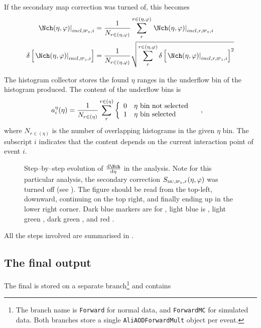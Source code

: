 If the secondary map correction was turned of, this becomes 
\begin{align}
  \label{eq:superhist:2}
  \dndetadphi[incl,\subIPz,i] &=
  \frac{1}{N_{r\in\etaphi}}\sum_{r}^{r\in\etaphi}  
  \dndetadphi[incl,r,\subIPz,i]\\
  \delta\left[\dndetadphi[incl,\subIPz,i]\right] &=
  \frac{1}{N_{r\in\etaphi}}\sqrt{\sum_{r}^{r\in\etaphi}   
    \delta\left[\dndetadphi[incl,r,\subIPz,i]\right]^2}
\end{align}

The histogram collector stores the found $\eta$ ranges in the
underflow bin of the histogram produced.  The content of the underflow
bins is %
\begin{align}
  \label{eq:underflow}
  a_i^{\eta}(\eta) &= 
  \frac{1}{N_{r\in(\eta)}}
  \sum_{r}^{r\in(\eta)} \left\{\begin{array}{cl} 
      0 & \eta \text{\ bin not selected}\\ 
      1 & \eta \text{\ bin selected}
      \end{array}\right.\quad,
\end{align}
where $N_{r\in(\eta)}$ is the number of overlapping histograms in the
given $\eta$ bin.  The subscript $i$ indicates that the content
depends on the current interaction point of event $i$.

\begin{figure}[]
  \centering
  \caption{Step--by--step evolution of $\dndeta$ in the analysis.
    Note for this particular analysis, the secondary correction
    $\SecMap{}$ was turned off (see ). The
    figure should be read from the top-left, downward,
    continuing on the top right, and finally ending up in the lower
    right corner. Dark blue markers are for , light blue is
    , light green , dark green , and red
    .}
  \label{fig:steps}
\end{figure} 

All the steps involved are summarised in . 

\subsection{The final \AOD{} output} 

The final \FMD{} \AOD{} is stored on a separate branch\footnote{The
  branch name is \texttt{Forward} for normal data, and
  \texttt{ForwardMC} for simulated data. Both branches store a single
  \texttt{AliAODForwardMult} object per event.} and contains 

